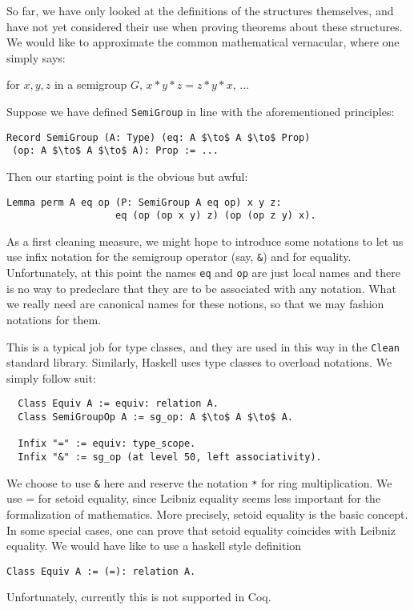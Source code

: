 \documentclass[a4paper,10pt,runningheads]{llncs}
\begin{document}
So far, we have only looked at the definitions of the structures themselves, and have not yet
considered their use when proving theorems about these structures.
We would like to approximate the common mathematical vernacular, where one
simply says:

for $x, y, z$ in a semigroup $G$, $x * y * z = z * y * x$, $\ldots$

Suppose we have defined \lstinline|SemiGroup| in line with the aforementioned principles:
\begin{lstlisting}
Record SemiGroup (A: Type) (eq: A $\to$ A $\to$ Prop)
 (op: A $\to$ A $\to$ A): Prop := ...
\end{lstlisting}

Then our starting point is the obvious but awful:
\begin{lstlisting}
Lemma perm A eq op (P: SemiGroup A eq op) x y z:
                   eq (op (op x y) z) (op (op z y) x).
\end{lstlisting}

As a first cleaning measure, we might hope to introduce some notations to let us use infix notation
for the semigroup operator (say, \lstinline|&|) and for equality. Unfortunately, at this point the names \lstinline|eq| and \lstinline|op| are just local names and there is no way to predeclare that they are to be associated with any notation. What we really need are canonical names for these notions, so that we may fashion notations for them.

This is a typical job for type classes, and they are used in this way in the \lstinline|Clean| standard
library. Similarly, Haskell uses type classes to overload notations.
We simply follow suit:
\begin{lstlisting}
  Class Equiv A := equiv: relation A.
  Class SemiGroupOp A := sg_op: A $\to$ A $\to$ A.

  Infix "=" := equiv: type_scope.
  Infix "&" := sg_op (at level 50, left associativity).
\end{lstlisting}

We choose to use \lstinline|&| here and reserve the notation \lstinline|*| for ring multiplication. We use = for setoid equality, since Leibniz equality seems less important for the formalization of
mathematics. More precisely, setoid equality is the basic concept. In some special cases, one can prove
that setoid equality coincides with Leibniz equality.
We would have like to use a haskell style definition
\begin{lstlisting}
Class Equiv A := (=): relation A.
\end{lstlisting}
Unfortunately, currently this is not supported in Coq.
\end{document}
